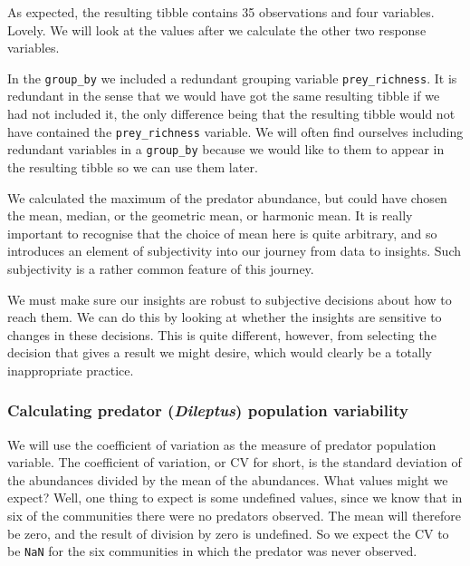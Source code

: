 \documentclass[]{book}
\begin{document}
As expected, the resulting tibble contains 35 observations and four variables. Lovely. We will look at the values after we calculate the other two response variables.

\begin{info}
In the \texttt{group\_by} we included a redundant grouping variable
\texttt{prey\_richness}. It is redundant in the sense that we would have
got the same resulting tibble if we had not included it, the only
difference being that the resulting tibble would not have contained the
\texttt{prey\_richness} variable. We will often find ourselves including
redundant variables in a \texttt{group\_by} because we would like to
them to appear in the resulting tibble so we can use them later.
\end{info}

\begin{warning}
We calculated the maximum of the predator abundance, but could have
chosen the mean, median, or the geometric mean, or harmonic mean. It is
really important to recognise that the choice of mean here is quite
arbitrary, and so introduces an element of subjectivity into our journey
from data to insights. Such subjectivity is a rather common feature of
this journey.
\end{warning}

\begin{reliability}
We must make sure our insights are robust to subjective decisions about
how to reach them. We can do this by looking at whether the insights are
sensitive to changes in these decisions. This is quite different,
however, from selecting the decision that gives a result we might
desire, which would clearly be a totally inappropriate practice.
\end{reliability}

\hypertarget{calculating-predator-dileptus-population-variability}{%
\subsubsection{\texorpdfstring{Calculating predator (\emph{Dileptus}) population variability}{Calculating predator (Dileptus) population variability}}\label{calculating-predator-dileptus-population-variability}}

We will use the coefficient of variation as the measure of predator population variable. The coefficient of variation, or CV for short, is the standard deviation of the abundances divided by the mean of the abundances. What values might we expect? Well, one thing to expect is some undefined values, since we know that in six of the communities there were no predators observed. The mean will therefore be zero, and the result of division by zero is undefined. So we expect the CV to be \texttt{NaN} for the six communities in which the predator was never observed.
\end{document}
